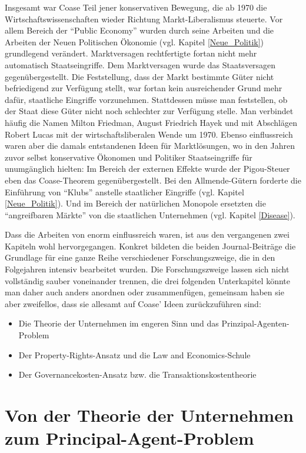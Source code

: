 Insgesamt war Coase Teil jener konservativen Bewegung, die ab 1970 die Wirtschaftswissenschaften wieder Richtung Markt-Liberalismus steuerte. Vor allem  Bereich der "`Public Economy"' wurden durch seine Arbeiten und die Arbeiten der Neuen Politischen Ökonomie (vgl. Kapitel \ref{Neue_Politik}) grundlegend verändert. Marktversagen rechtfertigte fortan nicht mehr automatisch Staatseingriffe. Dem Marktversagen wurde das Staatsversagen gegenübergestellt. Die Feststellung, dass der Markt bestimmte Güter nicht befriedigend zur Verfügung stellt, war fortan kein ausreichender Grund mehr dafür, staatliche Eingriffe vorzunehmen. Stattdessen müsse man feststellen, ob der Staat diese Güter nicht noch schlechter zur Verfügung stelle. Man verbindet häufig die Namen Milton Friedman, August Friedrich Hayek und mit Abschlägen Robert Lucas mit der wirtschaftsliberalen Wende um 1970. Ebenso einflussreich waren aber die damals entstandenen Ideen für Marktlösungen, wo in den Jahren zuvor selbst konservative Ökonomen und Politiker Staatseingriffe für unumgänglich hielten: Im Bereich der externen Effekte wurde der Pigou-Steuer eben das Coase-Theorem gegenübergestellt. Bei den Allmende-Gütern forderte \textcite{Buchanan1965} die Einführung von "`Klubs"' anstelle staatlicher Eingriffe (vgl. Kapitel \ref{Neue_Politik}). Und im Bereich der natürlichen Monopole ersetzten die "`angreifbaren Märkte"' von \textcite{Baumol1982} die staatlichen Unternehmen (vgl. Kapitel \ref{Disease}). 

Dass die Arbeiten von \textcite{Coase1937, Coase1960} enorm einflussreich waren, ist aus den vergangenen zwei Kapiteln wohl hervorgegangen. Konkret bildeten die beiden Journal-Beiträge die Grundlage für eine ganze Reihe verschiedener Forschungszweige, die in den Folgejahren intensiv bearbeitet wurden. Die Forschungszweige lassen sich nicht vollständig sauber voneinander trennen, die drei folgenden Unterkapitel könnte man daher auch anders anordnen oder zusammenfügen, gemeinsam haben sie aber zweifellos, dass sie allesamt auf Coase' Ideen zurückzuführen sind:
\begin{itemize}
	\item Die Theorie der Unternehmen im engeren Sinn und das Prinzipal-Agenten-Problem
	\item Der Property-Rights-Ansatz und die Law and Economics-Schule
	\item Der Governancekosten-Ansatz bzw. die Transaktionskostentheorie
\end{itemize}

\section{Von der Theorie der Unternehmen zum Principal-Agent-Problem}
\label{sec: Theorie_Unternehmen}

